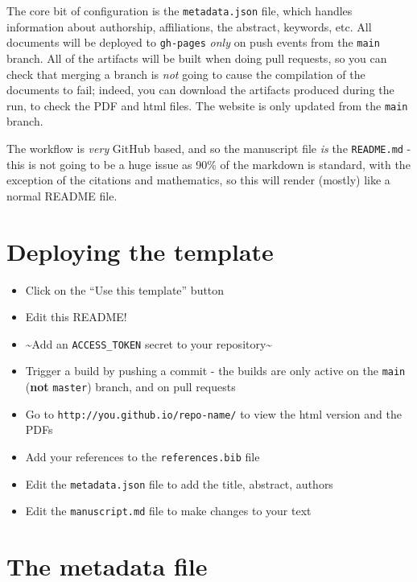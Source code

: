 \documentclass[11pt]{article}
\begin{document}
The core bit of configuration is the \texttt{metadata.json} file, which
handles information about authorship, affiliations, the abstract,
keywords, etc. All documents will be deployed to \texttt{gh-pages}
\emph{only} on push events from the \texttt{main} branch. All of the
artifacts will be built when doing pull requests, so you can check that
merging a branch is \emph{not} going to cause the compilation of the
documents to fail; indeed, you can download the artifacts produced
during the run, to check the PDF and html files. The website is only
updated from the \texttt{main} branch.

The workflow is \emph{very} GitHub based, and so the manuscript file
\emph{is} the \texttt{README.md} - this is not going to be a huge issue
as 90\% of the markdown is standard, with the exception of the citations
and mathematics, so this will render (mostly) like a normal README file.

\hypertarget{deploying-the-template}{%
\section{Deploying the template}\label{deploying-the-template}}

\begin{itemize}
\tightlist
\item
  Click on the ``Use this template'' button
\item
  Edit this README!
\item
  \textasciitilde Add an \texttt{ACCESS\_TOKEN} secret to your
  repository\textasciitilde{}
\item
  Trigger a build by pushing a commit - the builds are only active on
  the \texttt{main} (\textbf{not} \texttt{master}) branch, and on pull
  requests
\item
  Go to \texttt{http://you.github.io/repo-name/} to view the html
  version and the PDFs
\item
  Add your references to the \texttt{references.bib} file
\item
  Edit the \texttt{metadata.json} file to add the title, abstract,
  authors
\item
  Edit the \texttt{manuscript.md} file to make changes to your text
\end{itemize}

\hypertarget{the-metadata-file}{%
\section{The metadata file}\label{the-metadata-file}}
\end{document}
